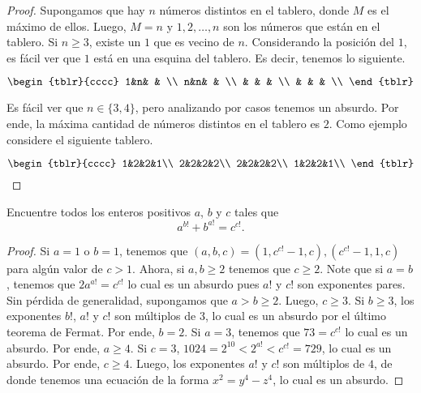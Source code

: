 \begin{proof}
	Supongamos que hay $n$ números distintos en el tablero, donde $M$ es el máximo de ellos. Luego, $M=n$ y $1,2,\dots,n$ son los números que están en el tablero. Si $n\ge 3$, existe un $1$ que es vecino de $n$. Considerando la posición del $1$, es fácil ver que $1$ está en una esquina del tablero. Es decir, tenemos lo siguiente.

	\[\begin{tblr}{cccc}
		1&n& & \\
		n&n& & \\
		 & & & \\
		 & & & \\
	\end{tblr}\]

	Es fácil ver que $n\in\{3,4\}$, pero analizando por casos tenemos un absurdo. Por ende, la máxima cantidad de números distintos en el tablero es $2$. Como ejemplo considere el siguiente tablero.

	\[\begin{tblr}{cccc}
		1&2&2&1\\
		2&2&2&2\\
		2&2&2&2\\
		1&2&2&1\\
	\end{tblr}\]
\end{proof}

\begin{probEG}
	Encuentre todos los enteros positivos $a$, $b$ y $c$ tales que
	\[a^{b!}+b^{a!}=c^{c!}.\]
\end{probEG}

\begin{proof}
	Si $a=1$ o $b=1$, tenemos que $(a,b,c)=\left(1,c^{c!}-1,c\right),\left(c^{c!}-1,1,c\right)$ para algún valor de $c>1$. Ahora, si $a,b\ge 2$ tenemos que $c\ge 2$. Note que si $a=b$, tenemos que $2a^{a!}=c^{c!}$ lo cual es un absurdo pues $a!$ y $c!$ son exponentes pares. Sin pérdida de generalidad, supongamos que $a>b\ge 2$. Luego, $c\ge 3$. Si $b\ge 3$, los exponentes $b!$, $a!$ y $c!$ son múltiplos de $3$, lo cual es un absurdo por el último teorema de Fermat. Por ende, $b=2$. Si $a=3$, tenemos que $73=c^{c!}$ lo cual es un absurdo. Por ende, $a\ge 4$. Si $c=3$, $1024=2^{10}<2^{a!}<c^{c!}=729$, lo cual es un absurdo. Por ende, $c\ge 4$. Luego, los exponentes $a!$ y $c!$ son múltiplos de $4$, de donde tenemos una ecuación de la forma $x^2=y^4-z^4$, lo cual es un absurdo.
\end{proof}

